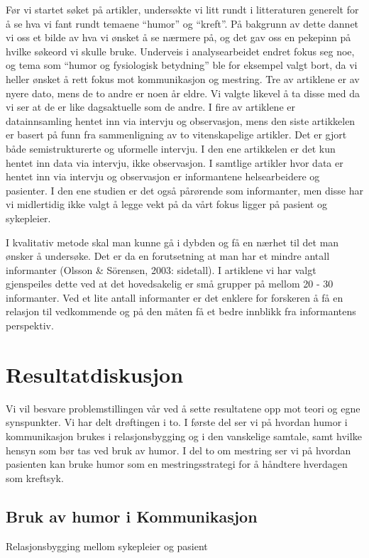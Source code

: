 Før vi startet søket på artikler, undersøkte vi litt rundt i litteraturen
generelt for å se hva vi fant rundt temaene “humor” og “kreft”. På bakgrunn av
dette dannet vi oss et bilde av hva vi ønsket å se nærmere på, og det gav oss
en pekepinn på hvilke søkeord vi skulle bruke. Underveis i analysearbeidet
endret fokus seg noe, og tema som “humor og fysiologisk betydning” ble for
eksempel valgt bort, da vi heller ønsket å rett fokus mot kommunikasjon og
mestring.  Tre av artiklene er av nyere dato, mens de to andre er noen år
eldre. Vi valgte likevel å ta disse med da vi ser at de er like dagsaktuelle
som de andre.  I fire av artiklene er datainnsamling hentet inn via intervju og
observasjon, mens den siste artikkelen er basert på funn fra sammenligning av
to vitenskapelige artikler. Det er gjort både semistrukturerte og uformelle
intervju. I den ene artikkelen er det kun hentet inn data via intervju, ikke
observasjon. I samtlige artikler hvor data er hentet inn via intervju og
observasjon er informantene helsearbeidere og pasienter. I den ene studien er
det også pårørende som informanter, men disse har vi midlertidig ikke valgt å
legge vekt på da vårt fokus ligger på pasient og sykepleier.

I kvalitativ metode skal man kunne gå i dybden og få en nærhet til det man
ønsker å undersøke. Det er da en forutsetning at man har et mindre antall
informanter (Olsson \&{} Sörensen, 2003: sidetall). I artiklene vi har valgt
gjenspeiles dette ved at  det hovedsakelig er små grupper på mellom 20 - 30
informanter. Ved et lite antall informanter er det enklere for forskeren å få
en relasjon til vedkommende og på den måten få et bedre innblikk fra
informantens perspektiv.

\section{Resultatdiskusjon}

Vi vil besvare problemstillingen vår ved å sette resultatene opp mot teori og
egne synspunkter. Vi har delt drøftingen i to. I første del ser vi på hvordan
humor i kommunikasjon brukes i relasjonsbygging og i den vanskelige samtale,
samt hvilke hensyn som bør tas ved bruk av humor. I del to om mestring ser vi
på hvordan pasienten kan bruke humor som en mestringsstrategi for å håndtere
hverdagen som kreftsyk.

\subsection{Bruk av humor i Kommunikasjon}
Relasjonsbygging mellom sykepleier og pasient


